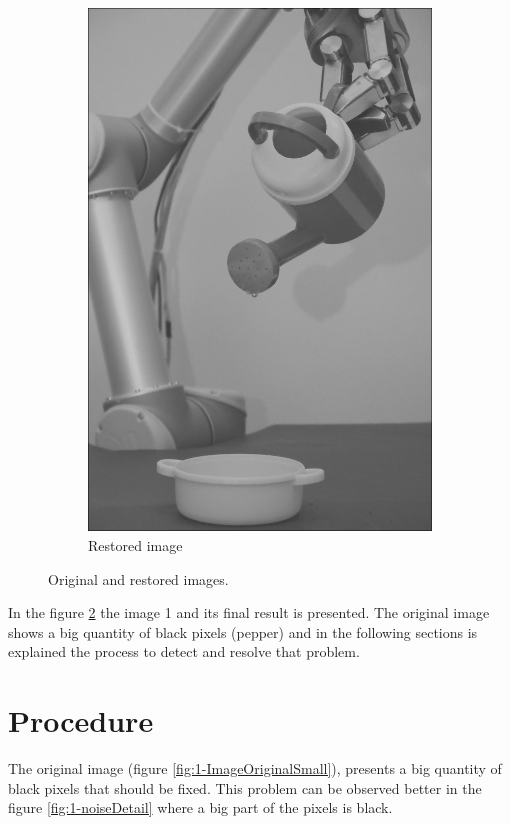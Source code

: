 \begin{figure}[!ht]
\begin{subfigure}{.49\textwidth}
		\includegraphics[width=1\textwidth]{figures/1-imageFiltered}
		\caption{Restored image}
		\label{fig:1-ImageFilteredSmall}
	\end{subfigure}
\caption{Original and restored images.}
\label{fig:1-originalAndRestored}
\end{figure}

In the figure \ref{fig:1-originalAndRestored} the image 1 and its final result is presented. The original image shows a big quantity of black pixels (pepper) and in the following sections is explained the process to detect and resolve that problem.

\section{Procedure}
\label{sec:image1_procedure}
The original image (figure \ref{fig:1-ImageOriginalSmall}), presents a big quantity of black pixels that should be fixed. This problem can be observed better in the figure \ref{fig:1-noiseDetail} where a big part of the pixels is black.

